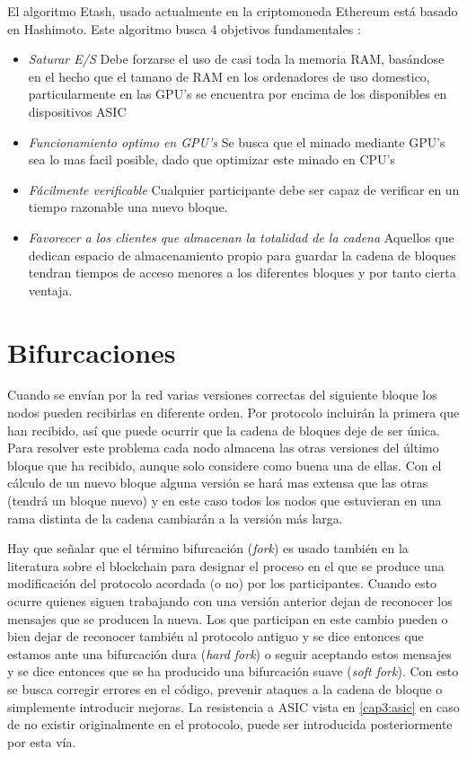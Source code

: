 El algoritmo Etash, usado actualmente en la criptomoneda Ethereum está basado en Hashimoto. Este algoritmo busca 4 objetivos fundamentales \citep{etash}:
\begin{itemize}
    \item \textit{Saturar E/S} Debe forzarse el uso de casi toda la memoria RAM, basándose en el hecho que el tamano de RAM en los ordenadores de uso domestico, particularmente en las GPU's se encuentra por encima de los disponibles en dispositivos ASIC
    \item \textit{Funcionamiento optimo en GPU's} Se busca que el minado mediante GPU's sea lo mas facil posible, dado que optimizar este minado en CPU's 
    \item \textit{Fácilmente verificable} Cualquier participante debe ser capaz de verificar en un tiempo razonable una nuevo bloque.
    \item \textit{Favorecer a los clientes que almacenan la totalidad de la cadena} Aquellos que dedican espacio de almacenamiento propio para guardar la cadena de bloques tendran tiempos de acceso menores a los diferentes bloques y por tanto cierta ventaja.
\end{itemize}


\section{Bifurcaciones}\label{cap3:bifurcaciones}
Cuando se envían por la red varias versiones correctas del siguiente bloque los nodos pueden recibirlas en diferente orden. Por protocolo incluirán la primera que han recibido, así que puede ocurrir que la cadena de bloques deje de ser única. Para resolver este problema cada nodo almacena las otras versiones del último bloque que ha recibido, aunque solo considere como buena una de ellas. Con el cálculo de un nuevo bloque alguna versión se hará mas extensa que las otras (tendrá un bloque nuevo) y en este caso todos los nodos que estuvieran en una rama distinta de la cadena cambiarán a la versión más larga.

Hay que señalar que el término bifurcación (\textit{fork}) es usado también en la literatura sobre el blockchain para designar el proceso en el que se produce una modificación del protocolo acordada (o no) por los participantes. Cuando esto ocurre quienes siguen trabajando con una versión anterior dejan de reconocer los mensajes que se producen la nueva. Los que participan en este cambio pueden o bien dejar de reconocer también al protocolo antiguo y se dice entonces que estamos ante una bifurcación dura (\textit{hard fork}) o seguir aceptando estos mensajes y se dice entonces que se ha producido una bifurcación suave (\textit{soft fork}). Con esto se busca corregir errores en el código, prevenir ataques a la cadena de bloque o simplemente introducir mejoras. La resistencia a ASIC vista en \ref{cap3:asic} en caso de no existir originalmente en el protocolo, puede ser introducida posteriormente por esta vía.

